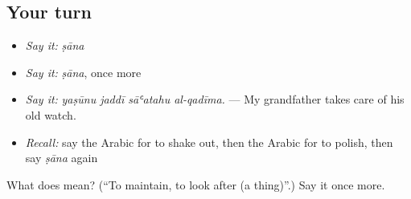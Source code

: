 \subsection*{Your turn}
\begin{itemize}
\raggedright
  \item \emph{Say it:} \emph{ṣāna}
  \item \emph{Say it:} \emph{ṣāna}, once more
  \item \emph{Say it:} \emph{yaṣūnu jaddī sāʿatahu al-qadīma.} — My grandfather takes care of his old watch.
  \item \emph{Recall:} say the Arabic for to shake out, then the Arabic for to polish, then say \emph{ṣāna} again
\end{itemize}

\begin{tcolorbox}[breakable,colback=teal!4,colframe=teal!35!black,title={Before you move on}]
What does  mean? (\textquotedblleft{}To maintain, to look after (a thing)\textquotedblright{}.) Say it once more.
\end{tcolorbox}
